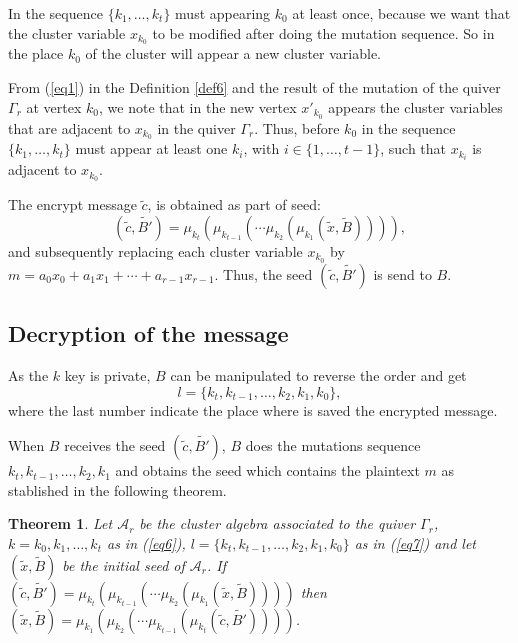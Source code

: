 \documentclass[12pt,a4paper]{article}
\newtheorem{Theorem}{Theorem}[section]
\begin{document}
In the sequence $\{k_1,\ldots, k_t\}$ must appearing $k_0$ at least once, because we want that the cluster variable $x_{k_0}$ to be  modified after doing the mutation sequence. So in the place $k_0$ of the cluster will appear a new cluster variable. 

From (\ref{eq1}) in the Definition \ref{def6} and the result of the mutation of the quiver $ \Gamma_r $ at vertex $ k_0 $, we note that in the new vertex $ x'_{k_0} $ appears the cluster variables that are adjacent to $ x_{k_0} $ in the quiver $ \Gamma_r $. Thus, before $ k_0 $ in the sequence $\{ k_1, \ldots, k_t \}$ must appear at least one $ k_i $, with $ i \in \lbrace 1, \ldots, t-1 \rbrace $, such that $ x_{k_i} $ is adjacent to $ x_{k_0} $.

The encrypt message $\tilde{c}$, is obtained as part of seed:
$$(\tilde{c},\tilde{B'})=\mu_{k_{t}}(\mu_{k_{t-1}}(\cdots \mu_{k_2}(\mu_{k_1}(\tilde{x},\tilde{B})))),$$ and subsequently replacing each cluster variable $x_{k_0}$ by $m= a_0x_0+a_1x_1 + \cdots + a_{r-1}x_{r-1}$. Thus, the seed $(\tilde{c},\tilde{B'})$ is send to $B$.

\subsection{Decryption of the message}

As the $ k $ key is private, $ B $ can be manipulated to reverse the order and get
\begin{equation}
l=\lbrace k_{t}, k_{t-1}, \ldots, k_2, k_1, k_0 \rbrace,
\label{eq7}
\end{equation}
where the last number indicate the place where is saved the encrypted message.


When $B$ receives the seed $(\tilde{c},\tilde{B'})$, $B$ does the mutations sequence $k_{t}, k_{t-1}, \ldots, k_2, k_1$ and obtains the seed which contains the plaintext $m$ as stablished in the following theorem. 

\begin{Theorem}
Let $\mathcal{A}_r$ be the cluster algebra associated to the quiver $\Gamma_r$, $k={k_0,k_1,\ldots,k_t}$ as in (\ref{eq6}), $l=\lbrace k_{t}, k_{t-1}, \ldots, k_2, k_1, k_0 \rbrace$ as in (\ref{eq7}) and let $(\tilde{x},\tilde{B})$ be  the initial seed of $\mathcal{A}_r$. If $(\tilde{c},\tilde{B'})=\mu_{k_{t}}(\mu_{k_{t-1}}(\cdots \mu_{k_2}(\mu_{k_1}(\tilde{x},\tilde{B}))))$ then $(\tilde{x},\tilde{B})= \mu_{k_{1}}(\mu_{k_{2}}(\cdots \mu_{k_{t-1}}(\mu_{k_t}(\tilde{c},\tilde{B'}))))$. 
\label{teo10}
\end{Theorem}
\end{document}
